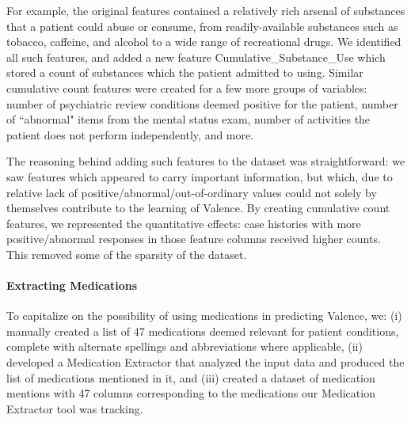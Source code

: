  For example, the original features contained a relatively rich arsenal of 
 substances that a patient could abuse or consume, from readily-available substances such as tobacco, caffeine, and alcohol to a wide range of recreational drugs. We identified all such features, and added a new feature
 \textsf{Cumulative\_Substance\_Use} which stored a count of substances which the patient
 admitted to using.  Similar cumulative count features were created for a few more 
 groups of variables: number of psychiatric review conditions deemed positive for the patient, number of ``abnormal" items from the mental status exam, number of activities
 the patient does not perform independently, and more.
 
 The reasoning behind adding such features to the dataset was straightforward: we saw features which appeared to carry important information, but which, due to relative lack of positive/abnormal/out-of-ordinary values could not solely by themselves contribute to the learning of \textsf{Valence}. By creating cumulative count features, we represented the quantitative effects: case histories with more positive/abnormal responses in those feature columns received higher counts. This removed some of the sparsity of the dataset. 
 
 
 
 \paragraph{Extracting Medications}  
 To capitalize on the possibility of using medications in predicting \textsf{Valence},
 we: (i)  manually created a list of 47 medications deemed relevant for
     patient conditions, complete with alternate spellings and abbreviations where applicable, (ii) developed a \textsf{Medication Extractor} that analyzed the input data and produced the list of medications mentioned in it, and (iii)
     created a dataset of medication mentions with 47 columns corresponding to the medications our \textsf{Medication Extractor} tool was tracking.     

